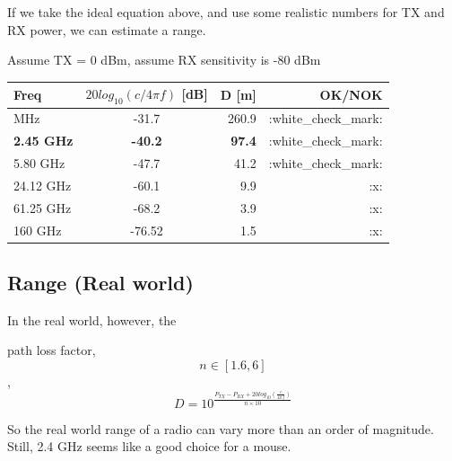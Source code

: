 If we take the ideal equation above, and use some realistic numbers for
TX and RX power, we can estimate a range.

Assume TX = 0 dBm, assume RX sensitivity is -80 dBm

\begin{longtable}[]{@{}lcrr@{}}
\toprule\noalign{}
Freq & \textbf{\(20 log_{10}\left(c/4 \pi f\right)\)} {[}dB{]} & D
{[}m{]} & OK/NOK \\
\midrule\noalign{}
\endhead
\bottomrule\noalign{}
\endlastfoot
915 MHz & -31.7 & 260.9 & :white\_check\_mark: \\
\textbf{2.45 GHz} & \textbf{-40.2} & \textbf{97.4} &
:white\_check\_mark: \\
5.80 GHz & -47.7 & 41.2 & :white\_check\_mark: \\
24.12 GHz & -60.1 & 9.9 & :x: \\
61.25 GHz & -68.2 & 3.9 & :x: \\
160 GHz & -76.52 & 1.5 & :x: \\
\end{longtable}

\subsection{Range (Real world)}\label{range-real-world}

In the real world, however, the

path loss factor, \[ n \in [1.6,6]\],
\[ D = 10^\frac{P_{TX} - P_{RX} + 20 log_{10}\left(\frac{c}{4 \pi f}\right)}{n
\times 10} \]

So the real world range of a radio can vary more than an order of
magnitude. Still, 2.4 GHz seems like a good choice for a mouse.


